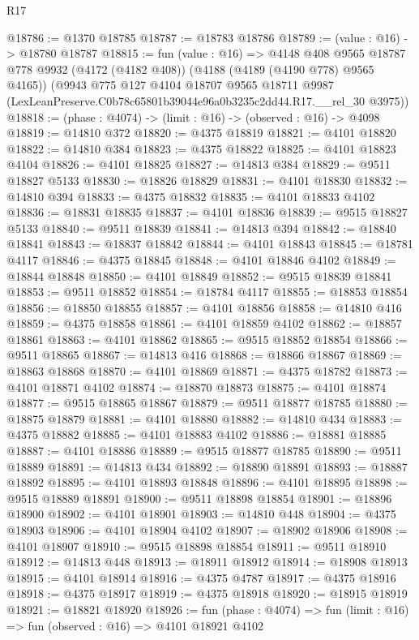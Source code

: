 \begin{lexlean}{R17}
\begin{coremodule}
@18786 := @1370 @18785
@18787 := @18783 @18786
@18789 := (value : @16) -> @18780 @18787
@18815 := fun (value : @16) =>
  @4148
    @408
    @9565
    @18787
    @778
    @9932
    (@4172 (@4182 @408))
    (@4188 (@4189 (@4190 @778) @9565 @4165))
    (@9943
      @775
      @127
      @4104
      @18707
      @9565
      @18711
      @9987
      (LexLeanPreserve.C0b78c65801b39044e96a0b3235c2dd44.R17.__rel_30 @3975))
@18818 := (phase : @4074) -> (limit : @16) -> (observed : @16) -> @4098
@18819 := @14810 @372
@18820 := @4375 @18819
@18821 := @4101 @18820
@18822 := @14810 @384
@18823 := @4375 @18822
@18825 := @4101 @18823 @4104
@18826 := @4101 @18825
@18827 := @14813 @384
@18829 := @9511 @18827 @5133
@18830 := @18826 @18829
@18831 := @4101 @18830
@18832 := @14810 @394
@18833 := @4375 @18832
@18835 := @4101 @18833 @4102
@18836 := @18831 @18835
@18837 := @4101 @18836
@18839 := @9515 @18827 @5133
@18840 := @9511 @18839
@18841 := @14813 @394
@18842 := @18840 @18841
@18843 := @18837 @18842
@18844 := @4101 @18843
@18845 := @18781 @4117
@18846 := @4375 @18845
@18848 := @4101 @18846 @4102
@18849 := @18844 @18848
@18850 := @4101 @18849
@18852 := @9515 @18839 @18841
@18853 := @9511 @18852
@18854 := @18784 @4117
@18855 := @18853 @18854
@18856 := @18850 @18855
@18857 := @4101 @18856
@18858 := @14810 @416
@18859 := @4375 @18858
@18861 := @4101 @18859 @4102
@18862 := @18857 @18861
@18863 := @4101 @18862
@18865 := @9515 @18852 @18854
@18866 := @9511 @18865
@18867 := @14813 @416
@18868 := @18866 @18867
@18869 := @18863 @18868
@18870 := @4101 @18869
@18871 := @4375 @18782
@18873 := @4101 @18871 @4102
@18874 := @18870 @18873
@18875 := @4101 @18874
@18877 := @9515 @18865 @18867
@18879 := @9511 @18877 @18785
@18880 := @18875 @18879
@18881 := @4101 @18880
@18882 := @14810 @434
@18883 := @4375 @18882
@18885 := @4101 @18883 @4102
@18886 := @18881 @18885
@18887 := @4101 @18886
@18889 := @9515 @18877 @18785
@18890 := @9511 @18889
@18891 := @14813 @434
@18892 := @18890 @18891
@18893 := @18887 @18892
@18895 := @4101 @18893 @18848
@18896 := @4101 @18895
@18898 := @9515 @18889 @18891
@18900 := @9511 @18898 @18854
@18901 := @18896 @18900
@18902 := @4101 @18901
@18903 := @14810 @448
@18904 := @4375 @18903
@18906 := @4101 @18904 @4102
@18907 := @18902 @18906
@18908 := @4101 @18907
@18910 := @9515 @18898 @18854
@18911 := @9511 @18910
@18912 := @14813 @448
@18913 := @18911 @18912
@18914 := @18908 @18913
@18915 := @4101 @18914
@18916 := @4375 @4787
@18917 := @4375 @18916
@18918 := @4375 @18917
@18919 := @4375 @18918
@18920 := @18915 @18919
@18921 := @18821 @18920
@18926 := fun (phase : @4074) => fun (limit : @16) => fun (observed : @16) => @4101 @18921 @4102

\end{coremodule}
\end{lexlean}
